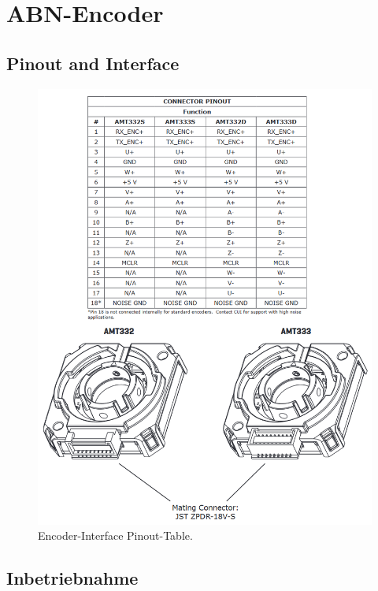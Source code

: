 \section{ABN-Encoder}\label{Appendix:ABC_Ecoder}

\subsection{Pinout and Interface}

\begin{figure}[H]
	\centering
	\includegraphics[width=\textwidth]{graphics/Encoder_Interface}
	\caption{Encoder-Interface Pinout-Table.\cite[S.5]{cui_devices_cui_2019}}
	\label{fig:Encoder_Interface}
\end{figure}

\newpage

\subsection{Inbetriebnahme}
%
%
%

